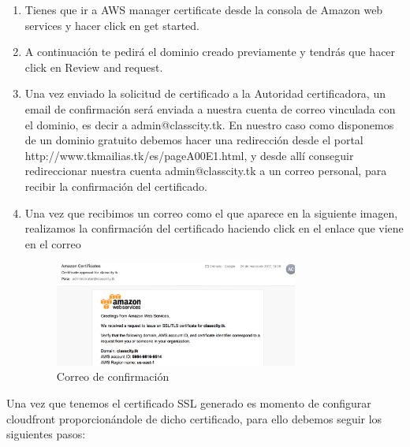 \begin{itemize}
    
     \begin{enumerate}
        \item Tienes que ir a AWS manager certificate desde la consola de Amazon web services y hacer click en get started.
        \item A continuación te pedirá el dominio creado previamente y tendrás que hacer click en Review and request.
        \item Una vez enviado la solicitud de certificado a la Autoridad certificadora, un email de confirmación será enviada a nuestra cuenta de correo vinculada con el dominio, es decir a admin@classcity.tk. En nuestro caso como disponemos de un dominio gratuito debemos hacer una redirección desde el portal http://www.tkmailias.tk/es/pageA00E1.html, y desde allí conseguir redireccionar nuestra cuenta admin@classcity.tk a un correo personal, para recibir la confirmación del certificado.
        \item Una vez que recibimos un correo como el que aparece en la siguiente imagen, realizamos la confirmación del certificado haciendo click en el enlace que viene en el correo
        \begin{figure}[H]
        \centering
        \includegraphics[width=80mm]{memoria/LaTeX/img/despliegue/ssl.png}
        \caption{Correo de confirmación}
        \end{figure}
    \end{enumerate}
    
    Una vez que tenemos el certificado SSL generado es momento de configurar cloudfront proporcionándole de dicho certificado, para ello debemos seguir los siguientes pasos:
    

\end{itemize}
